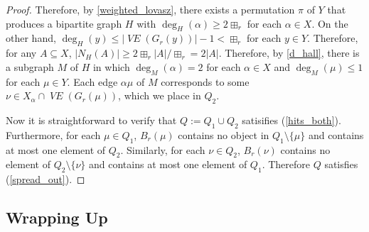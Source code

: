 \documentclass{patmorin}
\newcommand{\vol}[1]{\boxplus_{#1}}
\DeclareMathOperator{\VE}{\mathit{VE}}
\begin{document}
\begin{proof}

  Therefore, by \cref{weighted_lovasz}, there exists a permutation $\pi$ of $Y$ that produces a bipartite graph $H$ with $\deg_H(\alpha)\ge {2\vol{r}}$ for each $\alpha\in X$.  On the other hand, $\deg_{H}(y)\le |\VE(G_r(y))|-1 < {\vol{r}}$ for each $y\in Y$.  Therefore, for any $A\subseteq X$, $|N_H(A)|\ge {2\vol{r}}|A|/{\vol{r}} = 2|A|$.  Therefore, by \cref{d_hall}, there is a subgraph $M$ of $H$ in which $\deg_M(\alpha)=2$ for each $\alpha\in X$ and $\deg_M(\mu)\le 1$ for each $\mu\in Y$. Each edge $\alpha\mu$ of $M$ corresponds to some $\nu\in X_\alpha\cap\VE(G_r(\mu))$, which we place in $Q_2$.

  Now it is straightforward to verify that $Q:=Q_1\cup Q_2$ satisifies (\ref{hits_both}).  Furthermore, for each $\mu\in Q_1$, $B_r(\mu)$ contains no object in $Q_1\setminus\{\mu\}$ and contains at most one element of $Q_2$.  Similarly, for each $\nu\in Q_2$, $B_r(\nu)$ contains no element of $Q_2\setminus\{\nu\}$ and contains at most one element of $Q_1$.  Therefore $Q$ satisfies (\ref{spread_out}).
\end{proof}

\subsection{Wrapping Up}
\label{wrapping_up}
\end{document}
